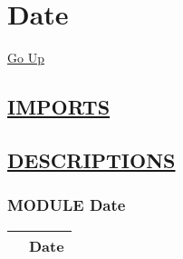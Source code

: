 \chapter*{\color{headfile}
Date
}
\hypertarget{ecldoc:toc:Date}{}
\hyperlink{ecldoc:toc:root}{Go Up}

\section*{\underline{\textsf{IMPORTS}}}
\begin{doublespace}
{\large
}
\end{doublespace}

\section*{\underline{\textsf{DESCRIPTIONS}}}
\subsection*{\textsf{\colorbox{headtoc}{\color{white} MODULE}
Date}}

\hypertarget{ecldoc:Date}{}

{\renewcommand{\arraystretch}{1.5}
\begin{tabularx}{\textwidth}{|>{\raggedright\arraybackslash}l|X|}
\hline
\hspace{0pt}\mytexttt{\color{red} } & \textbf{Date} \\
\hline
\end{tabularx}
}

\par


